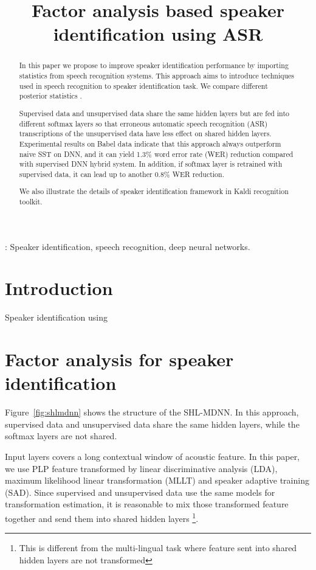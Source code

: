 \documentclass[a4paper]{article}
\title{Factor analysis based speaker identification using ASR}
\begin{document}
\maketitle
%
\begin{abstract}

In this paper we propose to improve speaker identification performance by importing statistics from speech 
recognition systems. This approach aims to introduce techniques used in speech recognition to speaker 
identification task. We compare different posterior statistics .

Supervised data and unsupervised data share the same hidden layers but are fed into different softmax layers so that
erroneous automatic speech recognition (ASR) transcriptions of the unsupervised data have less effect on shared 
hidden layers. Experimental results on Babel data indicate that this approach always outperform naive SST on DNN, 
and it can yield 1.3\% word error rate (WER) reduction compared with supervised DNN hybrid system. In addition, 
if softmax layer is retrained with supervised data, it can lead up to another 0.8\% WER reduction.

We also illustrate the details of speaker identification framework in Kaldi recognition toolkit. 

\end{abstract}
: Speaker identification, speech recognition, deep neural networks.


\section{Introduction}
Speaker identification using 


\section{Factor analysis for speaker identification}
\label{sec:shlmdnn}
Figure~\ref{fig:shlmdnn} shows the structure of the SHL-MDNN. In this approach, supervised data and unsupervised 
data share the same hidden layers, while the softmax layers are not shared.  

Input layers covers a long contextual window of acoustic feature. In this paper, we use PLP feature transformed by
linear discriminative analysis (LDA), maximum likelihood linear transformation (MLLT) and speaker adaptive training (SAD).
Since supervised and unsupervised data use the same models for transformation estimation, it is reasonable to mix those
transformed feature together and send them into shared hidden layers \footnote{This is different from the multi-lingual task
where feature sent into shared hidden layers are not transformed}.
\end{document}
